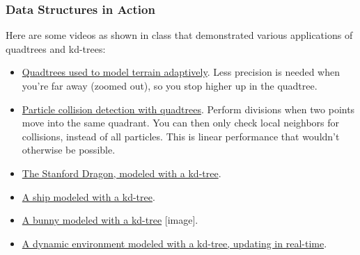 \documentclass[]{article}
\theoremstyle{definition}
\begin{document}
			\subsubsection{Data Structures in Action}
				Here are some videos as shown in class that demonstrated various applications of quadtrees and kd-trees:
				\begin{itemize}
					\item \href{http://www.youtube.com/watch?v=kNVne97Ti7I}{Quadtrees used to model terrain adaptively}. Less precision is needed when you're far away (zoomed out), so you stop higher up in the quadtree.
					\item \href{http://www.youtube.com/watch?v=fuexOsLOfl0}{Particle collision detection with quadtrees}. Perform divisions when two points move into the same quadrant. You can then only check local neighbors for collisions, instead of all particles. This is linear performance that wouldn't otherwise be possible.
					\item \href{http://vimeo.com/39118386}{The Stanford Dragon, modeled with a kd-tree}.
					\item \href{http://www.youtube.com/watch?v=NHoqyOJgzSg}{A ship modeled with a kd-tree}.
					\item \href{http://onepartcode.com/images/projects/bunnykd.png}{A bunny modeled with a kd-tree} [image].
					\item \href{http://www.youtube.com/watch?v=bHkaapcPyp0}{A dynamic environment modeled with a kd-tree, updating in real-time}.
				\end{itemize}
\end{document}
